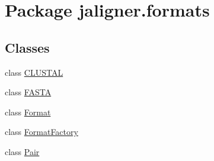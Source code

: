 \hypertarget{namespacejaligner_1_1formats}{\section{Package jaligner.\+formats}
\label{namespacejaligner_1_1formats}
}
\subsection*{Classes}
\begin{DoxyCompactItemize}
\item 
class \hyperlink{classjaligner_1_1formats_1_1_c_l_u_s_t_a_l}{C\+L\+U\+S\+T\+A\+L}
\item 
class \hyperlink{classjaligner_1_1formats_1_1_f_a_s_t_a}{F\+A\+S\+T\+A}
\item 
class \hyperlink{classjaligner_1_1formats_1_1_format}{Format}
\item 
class \hyperlink{classjaligner_1_1formats_1_1_format_factory}{Format\+Factory}
\item 
class \hyperlink{classjaligner_1_1formats_1_1_pair}{Pair}
\end{DoxyCompactItemize}
